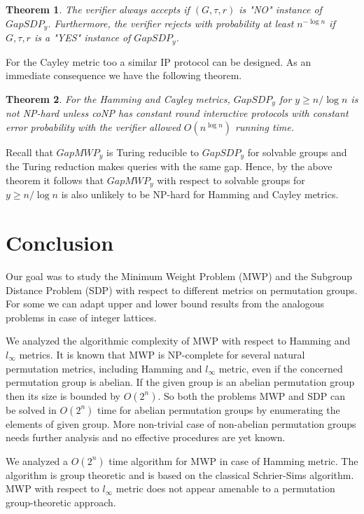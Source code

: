\documentclass[12pt]{report}
\newtheorem{theorem}{Theorem}[section]
\begin{document}
\begin{theorem}
	The verifier always accepts if $(G, \tau, r)$ is "NO" instance of $GapSDP_y$.
	Furthermore, the verifier rejects with probability at least $n^{-\log n}$ if $G, \tau, r$ is a "YES" instance of $GapSDP_y$.
\end{theorem}

For the Cayley metric too a similar IP protocol can be designed. As an immediate consequence we have the following theorem.

\begin{theorem}
	For the Hamming and Cayley metrics, $GapSDP_y$ for $y \geq n / \log n$ is not NP-hard unless coNP has constant round interactive protocols with constant error probability with the verifier allowed $O(n^{\log n})$ running time.
\end{theorem}

Recall that $GapMWP_y$ is Turing reducible to $GapSDP_y$ for solvable groups and the Turing reduction makes queries with the same gap. Hence, by the above theorem it follows that $GapMWP_y$ with respect to solvable groups for $y \geq n / \log n$ is also unlikely to be NP-hard for Hamming and Cayley metrics.

\newpage


\chapter*{Conclusion}

\indent \par Our goal was to study the Minimum Weight Problem (MWP) and the Subgroup Distance Problem (SDP) with respect to different metrics on permutation groups. For some we can adapt upper and lower bound results from the analogous problems in case of integer lattices.

We analyzed the algorithmic complexity of MWP with respect to Hamming and $l_\infty$ metrics. It is known that MWP is NP-complete for several natural permutation metrics, including Hamming and $l_\infty$ metric, even if the concerned permutation group is abelian. If the given group is an abelian permutation group then its size is bounded by $O(2^n)$. So both the problems MWP and SDP can be solved in $O(2^n)$ time for abelian permutation groups by enumerating the elements of given group. More non-trivial case of non-abelian permutation groups needs further analysis and no effective procedures are yet known.

We analyzed a $O(2^n)$ time algorithm for MWP in case of Hamming metric. The algorithm is group theoretic and is based on the classical Schrier-Sims algorithm. MWP with respect to $l_\infty$ metric does not appear amenable to a permutation group-theoretic approach.
\end{document}
